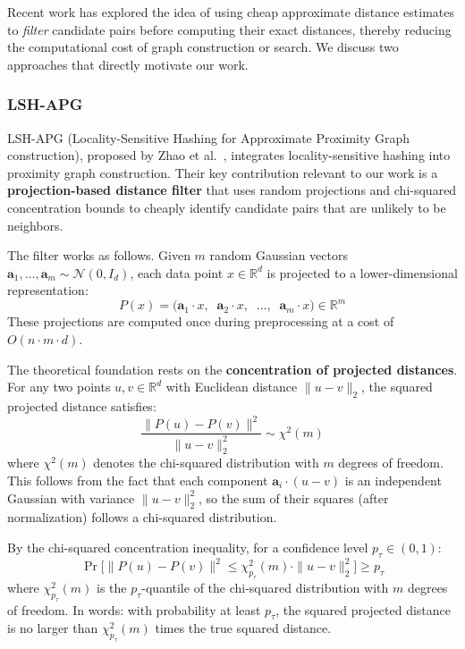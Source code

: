 Recent work has explored the idea of using cheap approximate distance estimates to \emph{filter} candidate pairs before computing their exact distances, thereby reducing the computational cost of graph construction or search.
We discuss two approaches that directly motivate our work.

\subsubsection{LSH-APG}
\label{sec:lsh_apg}

LSH-APG (Locality-Sensitive Hashing for Approximate Proximity Graph construction), proposed by Zhao et al.~\cite{zhao2023}, integrates locality-sensitive hashing into proximity graph construction.
Their key contribution relevant to our work is a \textbf{projection-based distance filter} that uses random projections and chi-squared concentration bounds to cheaply identify candidate pairs that are unlikely to be neighbors.

The filter works as follows.
Given $m$ random Gaussian vectors $\mathbf{a}_1, \ldots, \mathbf{a}_m \sim \mathcal{N}(0, I_d)$, each data point $x \in \mathbb{R}^d$ is projected to a lower-dimensional representation:
\begin{equation}
    P(x) = \big(\mathbf{a}_1 \cdot x, \;\; \mathbf{a}_2 \cdot x, \;\; \ldots, \;\; \mathbf{a}_m \cdot x\big) \in \mathbb{R}^m
    \label{eq:projection}
\end{equation}
These projections are computed once during preprocessing at a cost of $O(n \cdot m \cdot d)$.

The theoretical foundation rests on the \textbf{concentration of projected distances}.
For any two points $u, v \in \mathbb{R}^d$ with Euclidean distance $\|u - v\|_2$, the squared projected distance satisfies:
\begin{equation}
    \frac{\|P(u) - P(v)\|^2}{\|u - v\|_2^2} \sim \chi^2(m)
    \label{eq:chi2}
\end{equation}
where $\chi^2(m)$ denotes the chi-squared distribution with $m$ degrees of freedom.
This follows from the fact that each component $\mathbf{a}_i \cdot (u - v)$ is an independent Gaussian with variance $\|u - v\|_2^2$, so the sum of their squares (after normalization) follows a chi-squared distribution.

By the chi-squared concentration inequality, for a confidence level $p_\tau \in (0, 1)$:
\begin{equation}
    \Pr\!\Big[\|P(u) - P(v)\|^2 \leq \chi^2_{p_\tau}(m) \cdot \|u - v\|_2^2\Big] \geq p_\tau
    \label{eq:concentration}
\end{equation}
where $\chi^2_{p_\tau}(m)$ is the $p_\tau$-quantile of the chi-squared distribution with $m$ degrees of freedom.
In words: with probability at least $p_\tau$, the squared projected distance is no larger than $\chi^2_{p_\tau}(m)$ times the true squared distance.

